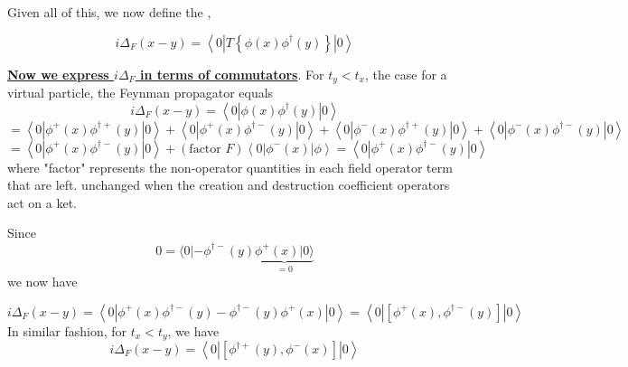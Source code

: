 Given all of this, we now define the ,
\begin{qt}
    \begin{equation}
i \Delta_{F}(x-y)=\left\langle 0\left|T\left\{\phi(x) \phi^{\dagger}(y)\right\}\right| 0\right\rangle
\end{equation}
\end{qt}

\underline{\textbf{Now we express $i\Delta_F$ in terms of commutators}}. For $t_y<t_x$, the case for a virtual particle, the Feynman propagator equals
$$
i \Delta_{F}(x-y)=\left\langle 0\left|\phi(x) \phi^{\dagger}(y)\right| 0\right\rangle
$$
$$
=\left\langle 0\left|\phi^{+}(x) \phi^{\dagger+}(y)\right| 0\right\rangle+\left\langle 0\left|\phi^{+}(x) \phi^{\dagger-}(y)\right| 0\right\rangle+\left\langle 0\left|\phi^{-}(x) \phi^{\dagger+}(y)\right| 0\right\rangle+\left\langle 0\left|\phi^{-}(x) \phi^{\dagger-}(y)\right| 0\right\rangle
$$
$$
=\left\langle 0\left|\phi^{+}(x) \phi^{\dagger-}(y)\right| 0\right\rangle+(\text {factor } F)\left\langle 0\left|\phi^{-}(x)\right| \phi\right\rangle=\left\langle 0\left|\phi^{+}(x) \phi^{\dagger-}(y)\right| 0\right\rangle
$$
where "factor" represents the non-operator quantities in each field operator term that are left. unchanged when the creation and destruction coefficient operators act on a ket. 

Since
$$
0=\langle 0|-\phi^{\dagger-}(y) \underbrace{\phi^{+}(x)|0\rangle}_{=0}
$$
we now have
\begin{qt}
    \begin{equation}
i \Delta_{F}(x-y)=\left\langle 0\left|\phi^{+}(x) \phi^{\dagger-}(y)-\phi^{\dagger-}(y) \phi^{+}(x)\right| 0\right\rangle=\left\langle 0\left|\left[\phi^{+}(x), \phi^{\dagger-}(y)\right]\right| 0\right\rangle
\end{equation}
In similar fashion, for $t_x<t_y$, we have
\begin{equation}
i \Delta_{F}(x-y)=\left\langle 0\left|\left[\phi^{\dagger+}(y), \phi^{-}(x)\right]\right| 0\right\rangle
\end{equation}
\end{qt}

